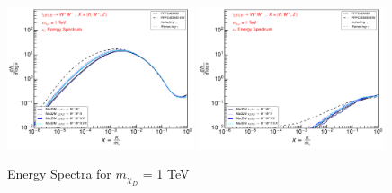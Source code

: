 \documentclass[epj,nopacs,fleqn]{svjour}
\begin{document}
\begin{figure}[!b]
\subfigure
{\includegraphics[width=0.49\textwidth]{Fig/1TeV/1_neutrinos_mu_PPPC_Comparison_xdxd_fotone_1.pdf}}
\subfigure
{\includegraphics[width=0.49\textwidth]{Fig/1TeV/1_neutrinos_tau_PPPC_Comparison_xdxd_fotone_1.pdf}}
\caption{Energy Spectra for $m_{\chi_D}$ = 1 TeV}
\end{figure}
%
%
%
\clearpage
\end{document}
